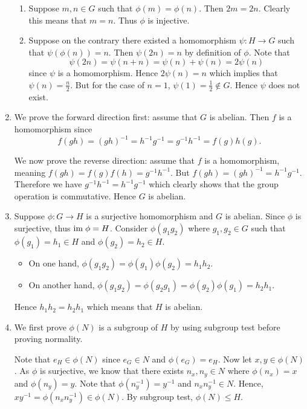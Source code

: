 \begin{enumerate}
\begin{enumerate}[label=(\alph*)]
        \item Suppose $m, n \in G$ such that $\phi(m) = \phi(n)$. Then $2m = 2n$. Clearly this means that $m = n$. Thus $\phi$ is injective.

        \item Suppose on the contrary there existed a homomorphism $\psi: H \to G$ such that $\psi(\phi(n)) = n$. Then $\psi(2n) = n$ by definition of $\phi$. Note that
        \[
            \psi(2n) = \psi(n + n) = \psi(n) + \psi(n) = 2\psi(n)
        \]
        since $\psi$ is a homomorphism. Hence $2\psi(n) = n$ which implies that $\psi(n) = \frac n2$. But for the case of $n = 1$, $\psi(1) = \frac 12 \notin G$. Hence $\psi$ does not exist.
    \end{enumerate}

    \item We prove the forward direction first: assume that $G$ is abelian. Then $f$ is a homomorphism since
    \[
        f(gh) = (gh)^{-1} = h^{-1}g^{-1} = g^{-1}h^{-1} = f(g)h(g).
    \]

    We now prove the reverse direction: assume that $f$ is a homomorphism, meaning $f(gh) = f(g)f(h) = g^{-1}h^{-1}$. But $f(gh) = (gh)^{-1} = h^{-1}g^{-1}$. Therefore we have $g^{-1}h^{-1} = h^{-1}g^{-1}$ which clearly shows that the group operation is commutative. Hence $G$ is abelian.

    \item Suppose $\phi: G \to H$ is a surjective homomorphism and $G$ is abelian. Since $\phi$ is surjective, thus $\mathrm{im}\; \phi = H$. Consider $\phi(g_1g_2)$ where $g_1, g_2 \in G$ such that $\phi(g_1) = h_1 \in H$ and $\phi(g_2) = h_2 \in H$.
    \begin{itemize}
        \item On one hand, $\phi(g_1g_2) = \phi(g_1)\phi(g_2) = h_1h_2$.
        \item On another hand, $\phi(g_1g_2) = \phi(g_2g_1) = \phi(g_2)\phi(g_1) = h_2h_1$.
    \end{itemize}
    Hence $h_1h_2 = h_2h_1$ which means that $H$ is abelian.

    \item We first prove $\phi(N)$ is a subgroup of $H$ by using subgroup test before proving normality.

    Note that $e_H \in \phi(N)$ since $e_G \in N$ and $\phi(e_G) = e_H$. Now let $x, y \in \phi(N)$. As $\phi$ is surjective, we know that there exists $n_x, n_y \in N$ where $\phi(n_x) = x$ and $\phi(n_y) = y$. Note that $\phi(n_y^{-1}) = y^{-1}$ and $n_xn_y^{-1} \in N$. Hence, $xy^{-1} = \phi(n_xn_y^{-1}) \in \phi(N)$. By subgroup test, $\phi(N) \leq H$.


\end{enumerate}
